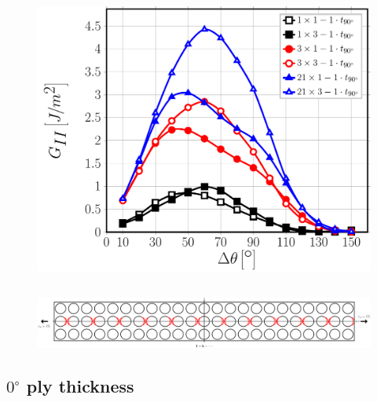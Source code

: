\documentclass[first,firstsupp,lastsupp,last,hyperref,table]{ETHclass}
\begin{document}
\begin{frame}
\begin{columns}[c]
\begin{column}{0.5\textwidth}
\begin{figure}
\includegraphics[width=\columnwidth]{nxk-1-vf60-GII-crackshield1.pdf}
\end{figure}
\end{column}
\end{columns}
\begin{figure}
\centering
\includegraphics[width=\textwidth]{twofibers-sameside-crackshielding1.pdf}
\end{figure}
\end{frame}

\subsection{$0^{\circ}$ ply thickness}
\end{document}
